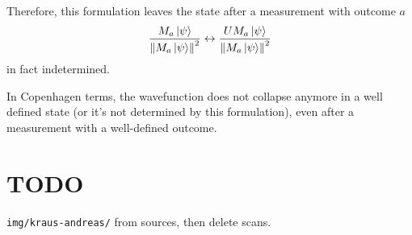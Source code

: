 Therefore, this formulation leaves the state after a measurement
with outcome $a$
\[
  \frac{M_a\ket{\psi}}{\norm{M_a\ket{\psi}}^2}
  \leftrightarrow
  \frac{UM_a\ket{\psi}}{\norm{M_a\ket{\psi}}^2}
\]
in fact indetermined.

In Copenhagen terms, the wavefunction does not collapse anymore
in a well defined state
(or it's not determined by this formulation),
even after a measurement with a
well-defined outcome.






\iftodo
\section{TODO}
\texttt{img/kraus-andreas/} from sources,
then delete scans.
\fi
